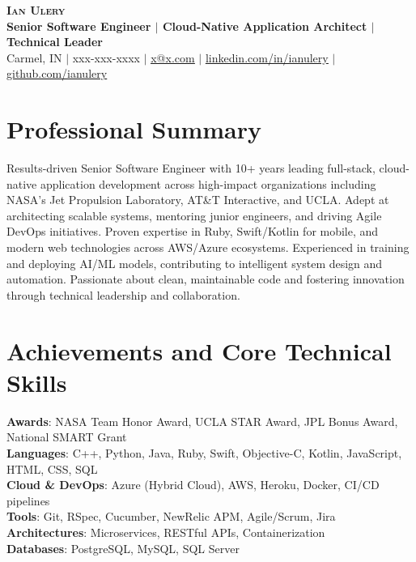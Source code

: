\documentclass[letterpaper,11pt]{article}
\begin{document}
  \begin{center}
    \textbf{\Huge \scshape Ian Ulery} \\
    \vspace{3pt}
    \textbf{\small{Senior Software Engineer $|$ Cloud-Native Application Architect $|$ Technical Leader}} \\
    \vspace{3pt}
    \small
      Carmel, IN $|$
      xxx-xxx-xxxx $|$
      \href{mailto:x@x.com}{\underline{x@x.com}} $|$
      \href{https://linkedin.com/in/ianulery}{\underline{linkedin.com/in/ianulery}} $|$
      \href{https://github.com/ianulery}{\underline{github.com/ianulery}}
  \end{center}

  \section{Professional Summary}
    \small{Results-driven Senior Software Engineer with 10+ years leading full-stack, cloud-native application development across high-impact organizations including NASA's Jet Propulsion Laboratory, AT\&T Interactive, and UCLA. Adept at architecting scalable systems, mentoring junior engineers, and driving Agile DevOps initiatives. Proven expertise in Ruby, Swift/Kotlin for mobile, and modern web technologies across AWS/Azure ecosystems. Experienced in training and deploying AI/ML models, contributing to intelligent system design and automation. Passionate about clean, maintainable code and fostering innovation through technical leadership and collaboration.}

  \section{Achievements and Core Technical Skills}
    \begin{itemize}[leftmargin=0.15in, label={}]
      \small{\item{
        \textbf{Awards}{: NASA Team Honor Award, UCLA STAR Award, JPL Bonus Award, National SMART Grant} \\
        \textbf{Languages}{: C++, Python, Java, Ruby, Swift, Objective-C, Kotlin, JavaScript, HTML, CSS, SQL} \\
        \textbf{Cloud \& DevOps}{: Azure (Hybrid Cloud), AWS, Heroku, Docker, CI/CD pipelines} \\
        \textbf{Tools}{: Git, RSpec, Cucumber, NewRelic APM, Agile/Scrum, Jira} \\
        \textbf{Architectures}{: Microservices, RESTful APIs, Containerization} \\
        \textbf{Databases}{: PostgreSQL, MySQL, SQL Server}
      }}
    \end{itemize}
\end{document}
